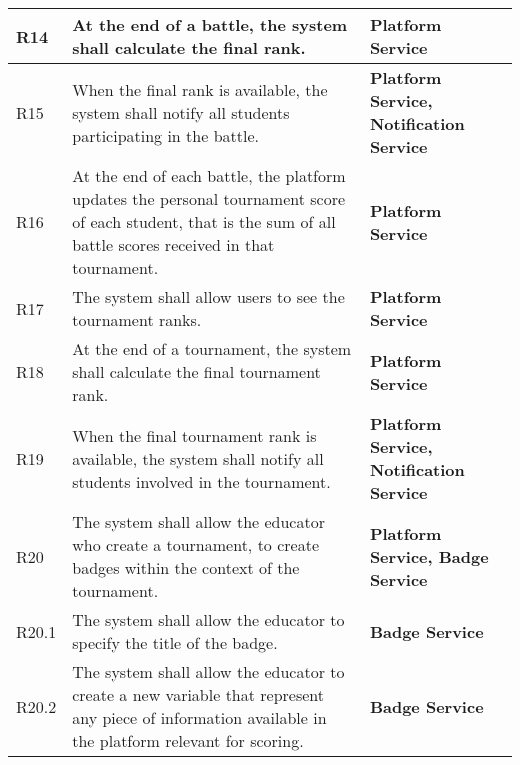\begin{center}
\begin{longtable}{|l|p{8cm}|p{5cm}|}
        R14   & At the end of a battle, the system shall calculate the final rank.                                                                                                             & \textbf{Platform Service}                                                  \\\hline
        R15   & When the final rank is available, the system shall notify all students participating in the battle.                                                                            & \textbf{Platform Service, Notification Service}                            \\\hline
        R16   & At the end of each battle, the platform updates the personal tournament score of each student, that is the sum of all battle scores received in that tournament.               & \textbf{Platform Service}                                                  \\\hline
        R17   & The system shall allow users to see the tournament ranks.                                                                                                                      & \textbf{Platform Service}                                                  \\\hline
        R18   & At the end of a tournament, the system shall calculate the final tournament rank.                                                                                              & \textbf{Platform Service}                                                  \\\hline
        R19   & When the final tournament rank is available, the system shall notify all students involved in the tournament.                                                                  & \textbf{Platform Service, Notification Service}                            \\\hline
        R20   & The system shall allow the educator who create a tournament, to create badges within the context of the tournament.                                                            & \textbf{Platform Service, Badge Service}                                   \\\hline
        R20.1 & The system shall allow the educator to specify the title of the badge.                                                                                                         & \textbf{Badge Service}                                                     \\\hline
        R20.2 & The system shall allow the educator to create a new variable that represent any piece of information available in the platform relevant for scoring.                           & \textbf{Badge Service}                                                     \\\hline

\end{longtable}
\end{center}
